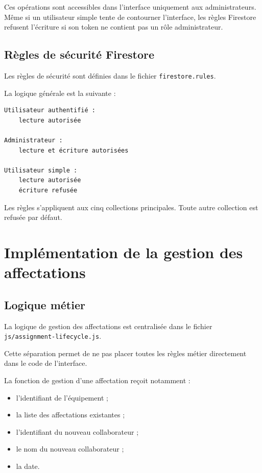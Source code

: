 \documentclass{rapportENSIAS}
\begin{document}
Ces opérations sont accessibles dans l’interface uniquement aux administrateurs. Même si un utilisateur simple tente de contourner l’interface, les règles Firestore refusent l’écriture si son token ne contient pas un rôle administrateur.

\subsection{Règles de sécurité Firestore}

Les règles de sécurité sont définies dans le fichier \texttt{firestore.rules}.

La logique générale est la suivante :

\begin{verbatim}
Utilisateur authentifié :
    lecture autorisée

Administrateur :
    lecture et écriture autorisées

Utilisateur simple :
    lecture autorisée
    écriture refusée
\end{verbatim}

Les règles s’appliquent aux cinq collections principales. Toute autre collection est refusée par défaut.

\section{Implémentation de la gestion des affectations}

\subsection{Logique métier}

La logique de gestion des affectations est centralisée dans le fichier \texttt{js/assignment-lifecycle.js}.

Cette séparation permet de ne pas placer toutes les règles métier directement dans le code de l’interface.

La fonction de gestion d’une affectation reçoit notamment :

\begin{itemize}
    \item l’identifiant de l’équipement ;
    \item la liste des affectations existantes ;
    \item l’identifiant du nouveau collaborateur ;
    \item le nom du nouveau collaborateur ;
    \item la date.
\end{itemize}
\end{document}
